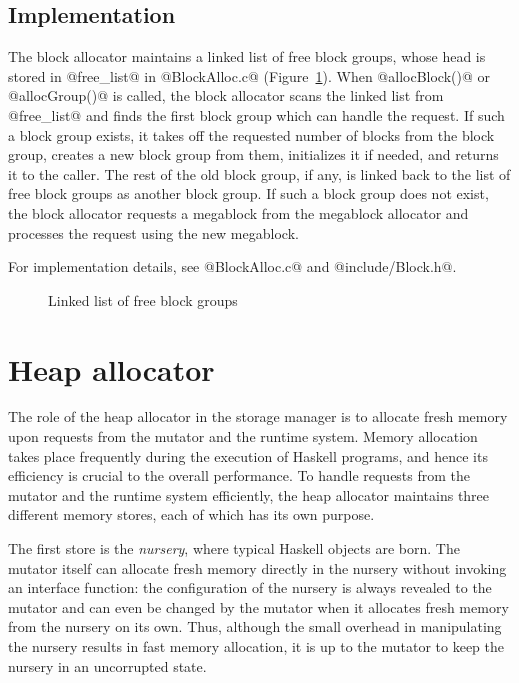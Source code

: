 \documentclass{article}
\begin{document}
\subsection{Implementation}

The block allocator maintains a linked list of free block groups, whose head
is stored in @free_list@ in @BlockAlloc.c@ (Figure~\ref{fig-freelist}).
When @allocBlock()@ or @allocGroup()@ is called, the block allocator
scans the linked list from @free_list@ and finds the first block group
which can handle the request.
If such a block group exists, it takes off the requested number of blocks
from the block group, creates a new block group from them, 
initializes it if needed, and returns it to the caller. 
The rest of the old block group, if any, is linked back to the list of free block 
groups as another block group. 
If such a block group does not exist, the block allocator requests a megablock
from the megablock allocator and processes the request using the new megablock.

For implementation details, see @BlockAlloc.c@ and @include/Block.h@.

\begin{figure}[ht]
\begin{center}

\caption{Linked list of free block groups}
\label{fig-freelist}
\end{center}
\end{figure}

\section{Heap allocator}

The role of the heap allocator in the storage manager is to allocate fresh
memory upon requests from the mutator and the runtime system.
Memory allocation takes place frequently during the execution of Haskell 
programs, and hence its efficiency is crucial to the overall performance.
To handle requests from the mutator and the runtime system efficiently,
the heap allocator maintains three different memory stores,
each of which has its own purpose.

The first store is the \emph{nursery}, where typical Haskell 
objects are born.
The mutator itself can allocate fresh memory directly in the nursery 
without invoking an interface function:
the configuration of the nursery is always revealed to the mutator and can even
be changed by the mutator when it allocates fresh memory from the nursery
on its own.
Thus, although the small overhead in manipulating the nursery results in fast
memory allocation, it is up to the mutator to keep the nursery in an 
uncorrupted state.
\end{document}
